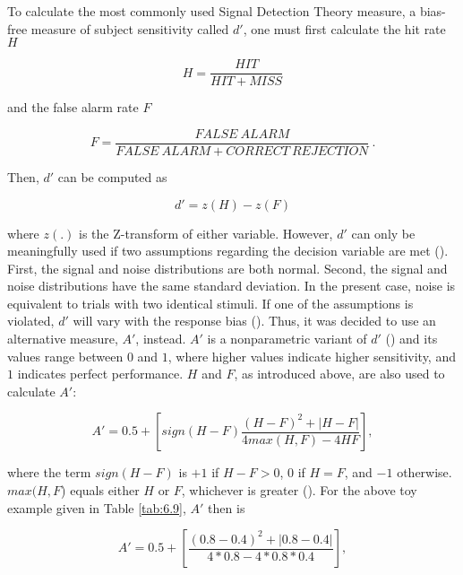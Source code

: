 To calculate the most commonly used Signal Detection Theory measure, a bias-free measure of subject sensitivity called $d'$, one must first calculate the hit rate $H$

\begin{equation}
\label{eq:H}
    H=\frac{HIT}{HIT+MISS}
\end{equation}

\noindent and the false alarm rate $F$

\begin{equation}
\label{eq:F}
    F=\frac{FALSE\ ALARM}{FALSE\ ALARM + CORRECT\ REJECTION}\ .
\end{equation}

Then, $d'$ can be computed as

\begin{equation}
\label{eq:dprime}
    d'=z(H)-z(F)
\end{equation}

\noindent where $z(.)$ is the Z-transform of either variable. However, $d'$ can only be meaningfully used if two assumptions regarding the decision variable are met (\cite{Stanislaw1999}). First, the signal and noise distributions are both normal. Second, the signal and noise distributions have the same standard deviation. In the present case, noise is equivalent to trials with two identical stimuli. If one of the assumptions is violated, $d'$ will vary with the response bias (\cite{Stanislaw1999}). Thus, it was decided to use an alternative measure, $A'$, instead. $A'$ is a nonparametric variant of $d'$ (\cite{Pollack1964}) and its values range between $0$ and $1$, where higher values indicate higher sensitivity, and $1$ indicates perfect performance. $H$ and $F$, as introduced above, are also used to calculate $A'$:

\begin{equation}
\label{eq:aprime}
    A'=0.5+\left [ sign(H-F)\frac{(H-F)^2+|H-F|}{4max(H,F)-4HF}\right ],
\end{equation}

\noindent where the term $sign(H-F)$ is $+1$ if $H-F>0$, $0$ if $H=F$, and $-1$ otherwise. $max⁡(H,F$) equals either $H$ or $F$, whichever is greater (\cite{Stanislaw1999}). For the above toy example given in Table \ref{tab:6.9}, $A'$ then is

\begin{equation}
\label{eq:aprimeex}
    A'=0.5+\left [ \frac{(0.8-0.4)^2+|0.8-0.4|}{4*0.8-4*0.8*0.4}\right ],
\end{equation}

